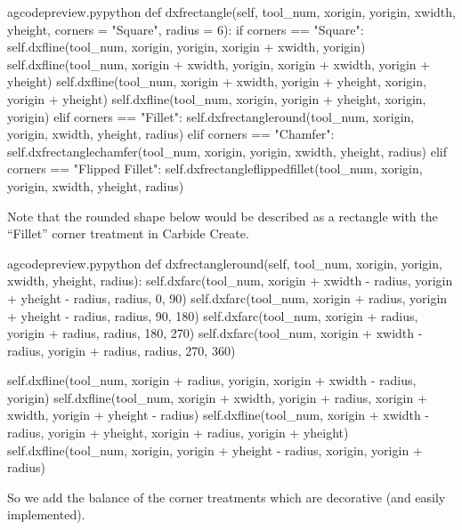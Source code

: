 \documentclass{ltxdoc}
\begin{document}
\lstset{firstnumber=\thegcpy}
\begin{writecode}{a}{gcodepreview.py}{python}
    def dxfrectangle(self, tool_num, xorigin, yorigin, xwidth, yheight, corners = "Square", radius = 6):
        if corners == "Square":
            self.dxfline(tool_num, xorigin, yorigin, xorigin + xwidth, yorigin)
            self.dxfline(tool_num, xorigin + xwidth, yorigin, xorigin + xwidth, yorigin + yheight)
            self.dxfline(tool_num, xorigin + xwidth, yorigin + yheight, xorigin, yorigin + yheight)
            self.dxfline(tool_num, xorigin, yorigin + yheight, xorigin, yorigin)
        elif corners == "Fillet":
            self.dxfrectangleround(tool_num, xorigin, yorigin, xwidth, yheight, radius)
        elif corners == "Chamfer":
            self.dxfrectanglechamfer(tool_num, xorigin, yorigin, xwidth, yheight, radius)
        elif corners == "Flipped Fillet":
            self.dxfrectangleflippedfillet(tool_num, xorigin, yorigin, xwidth, yheight, radius)

\end{writecode}
\addtocounter{gcpy}{13}

Note that the rounded shape below would be described as a rectangle with the ``Fillet'' corner treatment in Carbide Create.

\lstset{firstnumber=\thegcpy}
\begin{writecode}{a}{gcodepreview.py}{python}
    def dxfrectangleround(self, tool_num, xorigin, yorigin, xwidth, yheight, radius):
        self.dxfarc(tool_num, xorigin + xwidth - radius, yorigin + yheight - radius, radius,  0, 90)
        self.dxfarc(tool_num, xorigin + radius, yorigin + yheight - radius, radius, 90, 180)
        self.dxfarc(tool_num, xorigin + radius, yorigin + radius, radius, 180, 270)
        self.dxfarc(tool_num, xorigin + xwidth - radius, yorigin + radius, radius, 270, 360)

        self.dxfline(tool_num, xorigin + radius, yorigin, xorigin + xwidth - radius, yorigin)
        self.dxfline(tool_num, xorigin + xwidth, yorigin + radius, xorigin + xwidth, yorigin + yheight - radius)
        self.dxfline(tool_num, xorigin + xwidth - radius, yorigin + yheight, xorigin + radius, yorigin + yheight)
        self.dxfline(tool_num, xorigin, yorigin + yheight - radius, xorigin, yorigin + radius)

\end{writecode}
\addtocounter{gcpy}{11}

\noindent So we add the balance of the corner treatments which are decorative (and easily implemented). 
\end{document}
